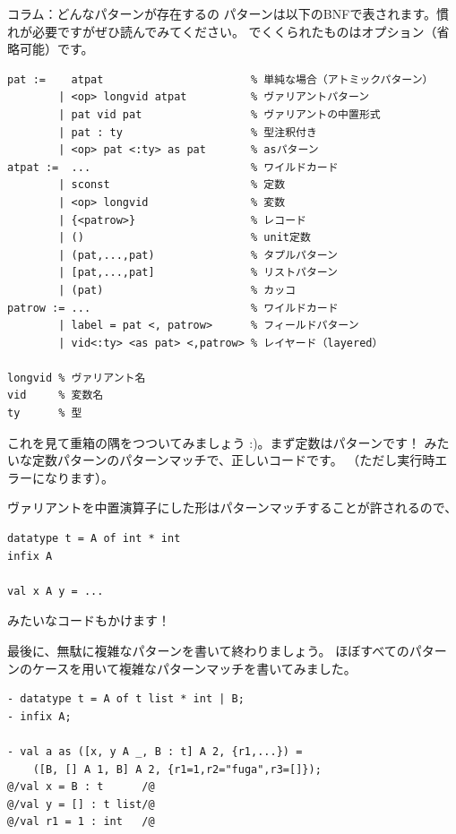 \documentclass[11pt,a4paper]{article}
\begin{document}
\begin{itembox}[l]{コラム：どんなパターンが存在するの}
  パターンは以下のBNFで表されます。慣れが必要ですがぜひ読んでみてください。
  \prog{<>}でくくられたものはオプション（省略可能）です。
\begin{Verbatim}
pat :=    atpat                       % 単純な場合（アトミックパターン）
        | <op> longvid atpat          % ヴァリアントパターン
        | pat vid pat                 % ヴァリアントの中置形式
        | pat : ty                    % 型注釈付き
        | <op> pat <:ty> as pat       % asパターン
atpat :=  ...                         % ワイルドカード
        | sconst                      % 定数
        | <op> longvid                % 変数
        | {<patrow>}                  % レコード
        | ()                          % unit定数
        | (pat,...,pat)               % タプルパターン
        | [pat,...,pat]               % リストパターン
        | (pat)                       % カッコ
patrow := ...                         % ワイルドカード
        | label = pat <, patrow>      % フィールドパターン
        | vid<:ty> <as pat> <,patrow> % レイヤード（layered）

longvid % ヴァリアント名
vid     % 変数名
ty      % 型
\end{Verbatim}

これを見て重箱の隅をつついてみましょう :)。まず定数はパターンです！
みたいな定数パターンのパターンマッチで、正しいコードです。
（ただし実行時エラーになります）。

ヴァリアントを中置演算子にした形はパターンマッチすることが許されるので、
\begin{lstlisting}[caption=中置形式のヴァリアントのパターンマッチ]
datatype t = A of int * int
infix A

val x A y = ...
\end{lstlisting}
みたいなコードもかけます！

最後に、無駄に複雑なパターンを書いて終わりましょう。
ほぼすべてのパターンのケースを用いて複雑なパターンマッチを書いてみました。
\begin{lstlisting}[caption=複雑なパターン]
- datatype t = A of t list * int | B;
- infix A;

- val a as ([x, y A _, B : t] A 2, {r1,...}) =
    ([B, [] A 1, B] A 2, {r1=1,r2="fuga",r3=[]});
@/val x = B : t      /@
@/val y = [] : t list/@
@/val r1 = 1 : int   /@

\end{lstlisting}
\end{itembox}
\end{document}

